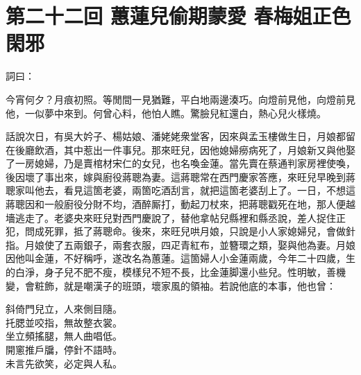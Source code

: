 
\chapter*{第二十二回 蕙蓮兒偷期蒙愛 春梅姐正色閑邪}


詞曰：

\begin{myquote} 
今宵何夕？月痕初照。等閒間一見猶難，平白地兩邊湊巧。向燈前見他，向燈前見他，一似夢中來到。何曾心料，他怕人瞧。驚臉兒紅還白，熱心兒火樣燒。

\end{myquote} 

話說次日，有吳大妗子、楊姑娘、潘姥姥衆堂客，因來與孟玉樓做生日，月娘都留在後廳飲酒，其中惹出一件事兒。那來旺兒，因他媳婦癆病死了，月娘新又與他娶了一房媳婦，乃是賣棺材宋仁的女兒，也名喚金蓮。{}當先賣在蔡通判家房裡使喚，後因壞了事出來，嫁與廚役蔣聰為妻。這蔣聰常在西門慶家答應，來旺兒早晚到蔣聰家叫他去，看見這箇老婆，兩箇吃酒刮言，就把這箇老婆刮上了。一日，不想這蔣聰因和一般廚役分財不均，酒醉厮打，動起刀杖來，把蔣聰戳死在地，那人便越墻逃走了。老婆央來旺兒對西門慶說了，替他拿帖兒縣裡和縣丞說，差人捉住正犯，問成死罪，抵了蔣聰命。{}後來，來旺兒哄月娘，只說是小人家媳婦兒，會做針指。月娘使了五兩銀子，兩套衣服，四疋青紅布，並簪環之類，娶與他為妻。月娘因他叫金蓮，不好稱呼，遂改名為蕙蓮。這箇婦人小金蓮兩歲，今年二十四歲，生的白淨，身子兒不肥不瘦，模樣兒不短不長，比金蓮脚還小些兒。性明敏，善機變，會粧飾，{}就是嘲漢子的班頭，壞家風的領袖。若說他底的本事，他也曾：

\begin{myquote} 
斜倚門兒立，人來側目隨。\\托腮並咬指，無故整衣裳。\\坐立頻搖腿，無人曲唱低。\\開窻推戶牖，停針不語時。{}\\未言先欲笑，必定與人私。
\end{myquote} 

